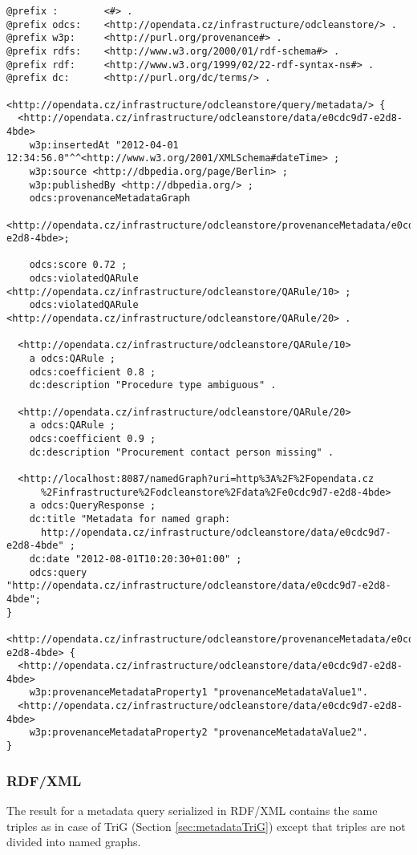 \begin{lstlisting}[caption={Example of metadata query response in TriG},label=lst:metadataTrigResponse]
@prefix :        <#> .
@prefix odcs:    <http://opendata.cz/infrastructure/odcleanstore/> .
@prefix w3p:     <http://purl.org/provenance#> .
@prefix rdfs:    <http://www.w3.org/2000/01/rdf-schema#> .
@prefix rdf:     <http://www.w3.org/1999/02/22-rdf-syntax-ns#> .
@prefix dc:      <http://purl.org/dc/terms/> .

<http://opendata.cz/infrastructure/odcleanstore/query/metadata/> {
  <http://opendata.cz/infrastructure/odcleanstore/data/e0cdc9d7-e2d8-4bde>
    w3p:insertedAt "2012-04-01 12:34:56.0"^^<http://www.w3.org/2001/XMLSchema#dateTime> ;
    w3p:source <http://dbpedia.org/page/Berlin> ;
    w3p:publishedBy <http://dbpedia.org/> ;
    odcs:provenanceMetadataGraph
      <http://opendata.cz/infrastructure/odcleanstore/provenanceMetadata/e0cdc9d7-e2d8-4bde>;
        
    odcs:score 0.72 ;
    odcs:violatedQARule <http://opendata.cz/infrastructure/odcleanstore/QARule/10> ;
    odcs:violatedQARule <http://opendata.cz/infrastructure/odcleanstore/QARule/20> .  

  <http://opendata.cz/infrastructure/odcleanstore/QARule/10>
    a odcs:QARule ;
    odcs:coefficient 0.8 ;
    dc:description "Procedure type ambiguous" .
        
  <http://opendata.cz/infrastructure/odcleanstore/QARule/20>
    a odcs:QARule ;
    odcs:coefficient 0.9 ;
    dc:description "Procurement contact person missing" .
        
  <http://localhost:8087/namedGraph?uri=http%3A%2F%2Fopendata.cz
      %2Finfrastructure%2Fodcleanstore%2Fdata%2Fe0cdc9d7-e2d8-4bde>
    a odcs:QueryResponse ;
    dc:title "Metadata for named graph:
      http://opendata.cz/infrastructure/odcleanstore/data/e0cdc9d7-e2d8-4bde" ;
    dc:date "2012-08-01T10:20:30+01:00" ;
    odcs:query "http://opendata.cz/infrastructure/odcleanstore/data/e0cdc9d7-e2d8-4bde";
}
    
<http://opendata.cz/infrastructure/odcleanstore/provenanceMetadata/e0cdc9d7-e2d8-4bde> {
  <http://opendata.cz/infrastructure/odcleanstore/data/e0cdc9d7-e2d8-4bde>
    w3p:provenanceMetadataProperty1 "provenanceMetadataValue1".
  <http://opendata.cz/infrastructure/odcleanstore/data/e0cdc9d7-e2d8-4bde>
    w3p:provenanceMetadataProperty2 "provenanceMetadataValue2".
}
\end{lstlisting}

\subsubsection{RDF/XML}
The result for a metadata query serialized in RDF/XML contains the same triples as in case of TriG (Section \ref{sec:metadataTriG}) except that triples are not divided into named graphs.

